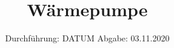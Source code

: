 

\subject{D206}
\title{Wärmepumpe}
\date{%
  Durchführung: DATUM
  \hspace{3em}
  Abgabe: 03.11.2020
}



\maketitle
\thispagestyle{empty}
\tableofcontents
\newpage





\nocite{*}
\printbibliography{}


